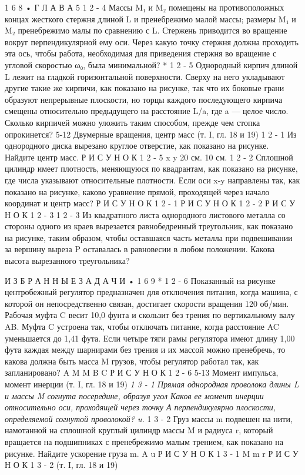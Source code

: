 \documentclass[10pt,oneside]{article}
\begin{document}
1 6 8 • Г Л А В А  5 \emph{ } 1 2 - 4 Массы M₁ и M₂ помещены на противоположных концах жесткого стержня длиной L и пренебрежимо малой массы; размеры M₁ и M₂ пренебрежимо малы по сравнению с L. Стержень приводится во вращение вокруг перпендикулярной ему оси. Через какую точку стержня должна проходить эта ось, чтобы работа, необходимая для приведения стержня во вращение с угловой скоростью ω₀, была минимальной? \emph{ } * 1 2 - 5 Однородный кирпич длиной L лежит на гладкой горизонтальной поверхности. Сверху на него укладывают другие такие же кирпичи, как показано на рисунке, так что их боковые грани образуют непрерывные плоскости, но торцы каждого последующего кирпича смещены относительно предыдущего на расстояние L/a, где a --- целое число. Сколько кирпичей можно уложить таким способом, прежде чем стопка опрокинется? 5-12 Двумерные вращения, центр масс (т. I, гл. 18 и 19) \emph{ } 1 2 - 1 Из однородного диска вырезано круглое отверстие, как показано на рисунке. Найдите центр масс. Р И С У Н О К  1 2 - 5 x y 20 см. 10 см. \emph{ } 1 2 - 2 Сплошной цилиндр имеет плотность, меняющуюся по квадрантам, как показано на рисунке, где числа указывают относительные плотности. Если оси x-y направлены так, как показано на рисунке, каково уравнение прямой, проходящей через начало координат и центр масс? Р И С У Н О К  1 2 - 1 Р И С У Н О К  1 2 - 2 Р И С У Н О К  1 2 - 3 \emph{ } 1 2 - 3 Из квадратного листа однородного листового металла со стороны одного из краев вырезается равнобедренный треугольник, как показано на рисунке, таким образом, чтобы оставшаяся часть металла при подвешивании за вершину выреза P оставалась в равновесии в любом положении. Какова высота вырезанного треугольника?\par

И З Б Р А Н Н Ы Е  З А Д А Ч И • 1 6 9 \emph{ } * 1 2 - 6 Показанный на рисунке центробежный регулятор предназначен для отключения питания, когда машина, с которой он непосредственно связан, достигает скорости вращения 120 об/мин. Рабочая муфта C весит 10,0 фунта и скользит без трения по вертикальному валу AB. Муфта C устроена так, чтобы отключать питание, когда расстояние AC уменьшается до 1,41 фута. Если четыре тяги рамы регулятора имеют длину 1,00 фута каждая между шарнирами без трения и их массой можно пренебречь, то какова должна быть масса M грузов, чтобы регулятор работал так, как запланировано? A M M B C Р И С У Н О К  1 2 - 6 5-13 Момент импульса, момент инерции (т. I, гл. 18 и 19) \emph{ 1 3 - 1 Прямая однородная проволока длины L и массы M согнута посередине, образуя угол Каков ее момент инерции относительно оси, проходящей через точку А перпендикулярно плоскости, определяемой согнутой проволокой? u. } 1 3 - 2 Груз массы m подвешен на нити, намотанной на сплошной круглый цилиндр массы M и радиуса r, который вращается на подшипниках с пренебрежимо малым трением, как показано на рисунке. Найдите ускорение груза m. A u Р И С У Н О К  1 3 - 1 M m r Р И С У Н О К  1 3 - 2 (т. I, гл. 18 и 19)\par
\end{document}

